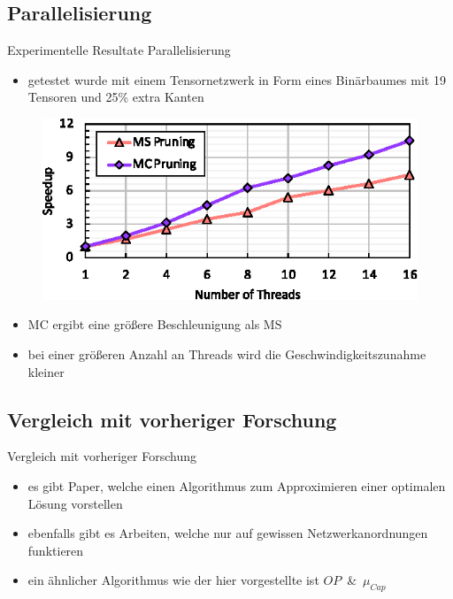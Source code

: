 \documentclass{beamer}
\begin{document}
\subsection{Parallelisierung}

\begin{frame}{Experimentelle Resultate Parallelisierung}
	\begin{itemize}
		\item getestet wurde mit einem Tensornetzwerk in Form eines Binärbaumes mit 19 Tensoren und 25\% extra Kanten
	\end{itemize}
	\begin{figure}
		\includegraphics{figure_13}
	\end{figure} \pause
	\begin{itemize}
		\item MC ergibt eine größere Beschleunigung als MS
		\item bei einer größeren Anzahl an Threads wird die Geschwindigkeitszunahme kleiner
	\end{itemize}
\end{frame}

\subsection{Vergleich mit vorheriger Forschung}

\begin{frame}{Vergleich mit vorheriger Forschung}
	\begin{itemize}
		\item es gibt Paper, welche einen Algorithmus zum Approximieren einer optimalen Lösung vorstellen
		\item ebenfalls gibt es Arbeiten, welche nur auf gewissen Netzwerkanordnungen funktieren
		\item ein ähnlicher Algorithmus wie der hier vorgestellte ist \mbox{$OP$ \& $\mu_{Cap}$}\cite{op_mu_cap}
	\end{itemize}
\end{frame}
\end{document}
